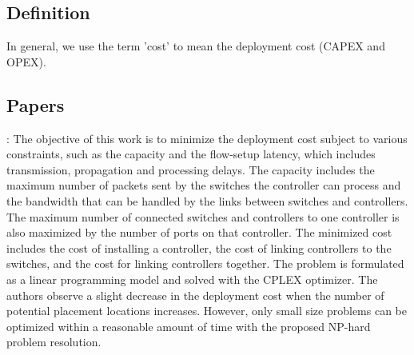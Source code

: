 \documentclass[a4paper,10pt]{article}
\begin{document}
\subsection{Definition}
In general, we use the term 'cost' to mean the deployment cost (CAPEX and OPEX). 


\subsection{Papers}

%
%
%
%

\cite{SaSt15}: The objective of this work is to minimize the deployment cost subject to various constraints, such as the capacity and the flow-setup latency, which includes transmission, propagation and processing delays. The capacity includes the maximum number of packets sent by the switches the controller can process and the bandwidth that can be handled by the links between switches and controllers. The maximum number of connected switches and controllers to one controller is also maximized by the number of ports on that controller. The minimized cost includes the cost of installing a controller, the cost of linking controllers to the switches, and the cost for linking controllers together. The problem is formulated as a linear programming model and solved with the CPLEX optimizer. The authors observe a slight decrease in the deployment cost when the number of potential placement locations increases. However, only small size problems can be optimized within a reasonable amount of time with the proposed NP-hard problem resolution. 
\end{document}
